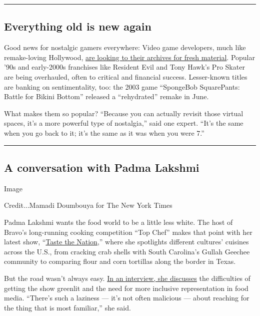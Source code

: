 \begin{center}\rule{0.5\linewidth}{\linethickness}\end{center}

\hypertarget{everything-old-is-new-again}{%
\subsection{Everything old is new
again}\label{everything-old-is-new-again}}

Good news for nostalgic gamers everywhere: Video game developers, much
like remake-loving Hollywood,
\href{https://www.nytimes3xbfgragh.onion/2020/08/01/business/video-game-remake-remaster-nostalgia.html}{are
looking to their archives for fresh material}. Popular '90s and
early-2000s franchises like Resident Evil and Tony Hawk's Pro Skater are
being overhauled, often to critical and financial success. Lesser-known
titles are banking on sentimentality, too: the 2003 game ``SpongeBob
SquarePants: Battle for Bikini Bottom'' released a ``rehydrated'' remake
in June.

What makes them so popular? ``Because you can actually revisit those
virtual spaces, it's a more powerful type of nostalgia,'' said one
expert. ``It's the same when you go back to it; it's the same as it was
when you were 7.''

\begin{center}\rule{0.5\linewidth}{\linethickness}\end{center}

\hypertarget{a-conversation-with-padma-lakshmi}{%
\subsection{A conversation with Padma
Lakshmi}\label{a-conversation-with-padma-lakshmi}}

Image

Credit...Mamadi Doumbouya for The New York Times

Padma Lakshmi wants the food world to be a little less white. The host
of Bravo's long-running cooking competition ``Top Chef'' makes that
point with her latest show,
``\href{https://www.nytimes3xbfgragh.onion/2020/06/18/dining/padma-lakshmi-taste-the-nation.html}{Taste
the Nation},'' where she spotlights different cultures' cuisines across
the U.S., from cracking crab shells with South Carolina's Gullah Geechee
community to comparing flour and corn tortillas along the border in
Texas.

But the road wasn't always easy.
\href{https://www.nytimes3xbfgragh.onion/interactive/2020/08/03/magazine/padma-lakshmi-interview.html}{In
an interview, she discusses} the difficulties of getting the show
greenlit and the need for more inclusive representation in food media.
``There's such a laziness --- it's not often malicious --- about
reaching for the thing that is most familiar,'' she said.

